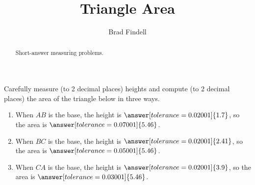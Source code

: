 \documentclass[nooutcomes]{ximera}
\title{Triangle Area}
\author{Brad Findell}
\begin{document}
\begin{abstract}
Short-answer measuring problems. 
\end{abstract}
\maketitle

\begin{problem}
Carefully measure (to 2 decimal places) heights and compute (to 2 decimal places) the area of the triangle below in three ways.  
\begin{center}  
\end{center}
\begin{enumerate}
\item When $AB$ is the base, the height is $\answer[tolerance=0.02001]{1.7}$, so the area is $\answer[tolerance=0.07001]{5.46}$.
\item When $BC$ is the base, the height is $\answer[tolerance=0.02001]{2.41}$, so the area is $\answer[tolerance=0.05001]{5.46}$.
\item When $CA$ is the base, the height is $\answer[tolerance=0.02001]{3.9}$, so the area is $\answer[tolerance=0.03001]{5.46}$.
\end{enumerate}
\end{problem}
\end{document}
